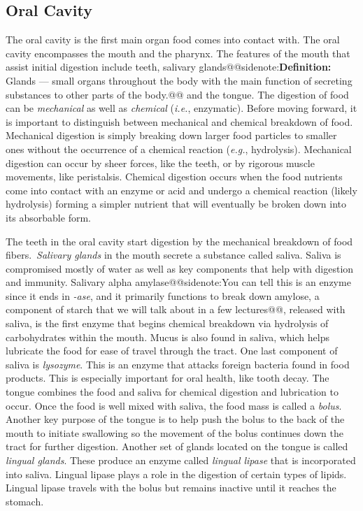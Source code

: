 \documentclass{tufte-handout}
\makeatletter
\def\sidenote#1{@@sidenote:#1@@}
\makeatother
\begin{document}
\subsection{Oral Cavity}
The oral cavity is the first main organ food comes into contact with. The oral cavity encompasses the mouth and the pharynx. The features of the mouth that assist initial digestion include teeth, salivary glands\sidenote{\textbf{Definition:} Glands --- small organs throughout the body with the
main function of secreting substances to other parts of the body.} and the tongue. The digestion of food can be \emph{mechanical} as well as \emph{chemical} (\textit{i.e.}, enzymatic). Before moving forward, it is important to distinguish between mechanical and chemical breakdown of food. Mechanical digestion is simply breaking down larger food particles to smaller ones without the occurrence of a chemical reaction (\textit{e.g.}, hydrolysis). Mechanical digestion can occur by sheer forces, like the teeth, or by rigorous muscle movements, like peristalsis. Chemical digestion occurs when the food nutrients come into contact with an enzyme or acid and undergo a chemical reaction (likely hydrolysis) forming a simpler nutrient that will eventually be broken down into its absorbable form. 

The teeth in the oral cavity start digestion by the mechanical breakdown of food fibers.\ \emph{Salivary glands} in the mouth secrete a substance called saliva. Saliva is compromised mostly of water as well as key components that help with digestion and immunity. Salivary alpha amylase\sidenote{You can tell this is an enzyme since it ends in \emph{-ase}, and it primarily functions to break down amylose, a component of starch that we will talk about in a few lectures}, released with saliva, is the first enzyme that begins chemical breakdown via hydrolysis of carbohydrates within the mouth. Mucus is also found in saliva, which helps lubricate the food for ease of travel through the tract. One last component of saliva is \emph{lysozyme}. This is an enzyme that attacks foreign bacteria found in food products. This is especially important for oral health, like tooth decay. The tongue combines the food and saliva for chemical digestion and lubrication to occur. Once the food is well mixed with saliva, the food mass is called a \emph{bolus}. Another key purpose of the tongue is to help push the bolus to the back of the mouth to initiate swallowing so the movement of the bolus continues down the tract for further digestion. Another set of glands located on the tongue is called \emph{lingual glands}. These produce an enzyme called \emph{lingual lipase} that is incorporated into saliva. Lingual lipase plays a role in the digestion of certain types of lipids. Lingual lipase travels with the bolus but remains inactive until it reaches the stomach.
\end{document}

